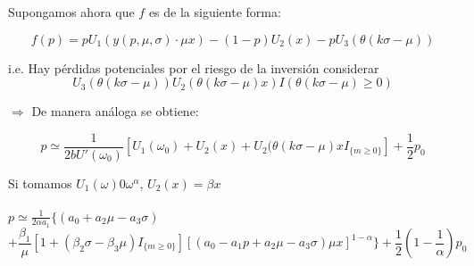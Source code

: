 Supongamos ahora que $f$ es de la siguiente forma:

\[f(p)=pU_1(y(p,\mu,\sigma)\cdot \mu x)-(1-p)U_2(x)-pU_3(\theta(k\sigma-\mu))\]
 
i.e. Hay pérdidas potenciales por el riesgo de la inversión considerar
\[U_3(\theta(k\sigma-\mu))U_2(\theta(k\sigma-\mu)x)I(\theta(k\sigma-\mu)\ge 0)\]
 
$\Rightarrow$ De manera análoga se obtiene:

\[p\simeq\frac{1}{2bU'(\omega_0)}[U_1(\omega_0)+U_2(x)+U_2(\theta(k\sigma-\mu)xI_{\{m\ge0\}}]+\frac{1}{2}p_0\]
 
\newpage 
Si tomamos $U_1(\omega)0\omega^\alpha$, $U_2(x)=\beta x$ \\\\
 
$p\simeq \frac{1}{2\alpha a_1}\{(a_0+a_2\mu-a_3\sigma)$
\[+\frac{\beta_1}{\mu}[1+(\beta_2\sigma-\beta_3 \mu)I_{\{m\ge0\}}][(a_0-a_1p+a_2\mu-a_3\sigma)\mu x]^{1-\alpha}\}+\frac{1}{2}(1-\frac{1}{\alpha})p_0\] 


